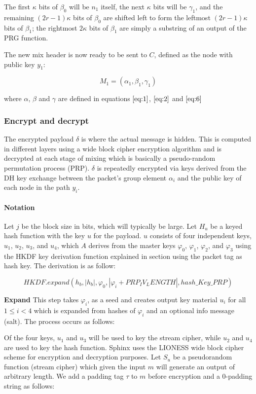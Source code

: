 The first $\kappa$ bits of $\beta_0$ will be $n_{1}$ itself, the next $\kappa$ bits will be $\gamma_{1}$, and the remaining $(2r-1)\kappa$ bits of $\beta_0$ are shifted left to form the leftmost $(2r-1)\kappa$ bits of $\beta_{1}$; the rightmost $2\kappa$ bits of $\beta_{1}$ are simply a substring of an output of the PRG function.

The new mix header is now ready to be sent to $C$, defined as the node with public key $y_1$:

$$M_1=(\alpha_1,\beta_1,\gamma_1)$$

where $\alpha$, $\beta$ and $\gamma$ are defined in equations $\ref{eq:1}$, $\ref{eq:2}$ and $\ref{eq:6}$

\subsubsection{Encrypt and decrypt}
The encrypted payload $\delta$ is where the actual message is hidden. This is computed in different layers using a wide block cipher encryption algorithm and is decrypted at each stage of mixing which is basically a pseudo-random permutation process (PRP). $\delta$ is repeatedly encrypted via keys derived from the DH key exchange between the packet’s group element $\alpha_i$ and the public key of each node in the path $y_i$.

\paragraph{Notation}
Let $j$ be the block size in bits, which will typically be large. Let $H_u$ be a keyed hash function with the key $u$ for the payload. $u$ consists of four independent keys, $u_1$, $u_2$, $u_3$, and $u_4$, which $A$ derives from the master keys $\varphi_0$, $\varphi_1$, $\varphi_2$, and $\varphi_3$ using the HKDF key derivation function explained in  section using the packet tag as hash key. The derivation is as follow:

$$HKDF.expand(h_b, |h_b|,\varphi_0, |\varphi_i + PRP_IV_LENGTH|, hash\_Key\_PRP)$$


\textbf{Expand} This step takes $\varphi_i$, as a seed and creates output key material $u_i$ for all $1\le i < 4 $ which is expanded from hashes of $\varphi_i$ and an optional info message (salt). The process occurs as follows:

Of the four keys, $u_1$ and $u_3$ will be used to key the stream cipher, while $u_2$ and $u_4$ are used to key the hash function. Sphinx uses the LIONESS wide block cipher scheme for encryption and decryption purposes. Let $S_u$ be a pseudorandom function (stream cipher) which given the input $m$ will generate an output of arbitrary length. We add a padding tag $\tau$ to $m$ before encryption and a 0-padding string as follows:

